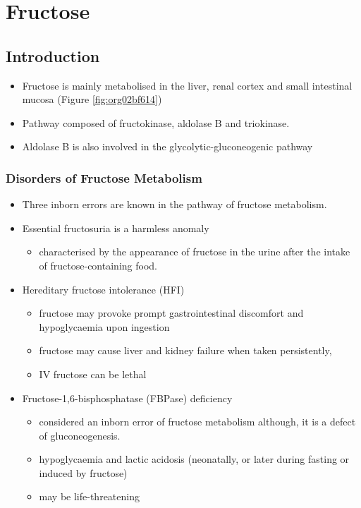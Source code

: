 \documentclass{scrartcl}
\begin{document}
\section{Fructose}
\label{sec:org773224d}
\subsection{Introduction}
\label{sec:orgfc66b2f}
\begin{itemize}
\item Fructose is mainly metabolised in the liver, renal cortex and small
intestinal mucosa (Figure \ref{fig:org02bf614})
\item Pathway composed of fructokinase, aldolase B and triokinase.
\item Aldolase B is also involved in the glycolytic-gluconeogenic pathway
\end{itemize}

\subsubsection{Disorders of Fructose Metabolism}
\label{sec:orgb2b5503}
\begin{itemize}
\item Three inborn errors are known in the pathway of fructose metabolism.
\item Essential fructosuria is a harmless anomaly
\begin{itemize}
\item characterised by the appearance of fructose in the urine after the intake of fructose-containing food.
\end{itemize}
\item Hereditary fructose intolerance (HFI)
\begin{itemize}
\item fructose may provoke prompt gastrointestinal discomfort and hypoglycaemia upon ingestion
\item fructose may cause liver and kidney failure when taken persistently,
\item IV fructose can be lethal
\end{itemize}
\item Fructose-1,6-bisphosphatase (FBPase) deficiency
\begin{itemize}
\item considered an inborn error of fructose metabolism although, it is a defect of gluconeogenesis.
\item hypoglycaemia and lactic acidosis (neonatally, or later during fasting or induced by fructose)
\item may be life-threatening
\end{itemize}
\end{itemize}
\end{document}
